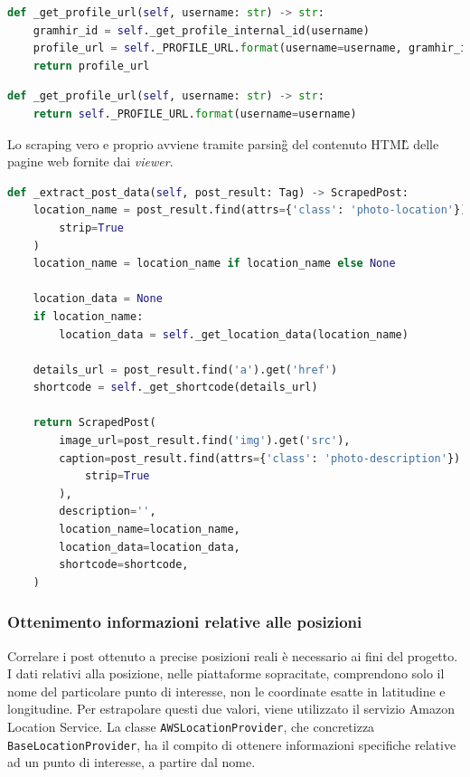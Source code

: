 \begin{lstlisting}[language=Python, caption=Ottenimento URL profilo in \textit{Gramhir}]
def _get_profile_url(self, username: str) -> str:
    gramhir_id = self._get_profile_internal_id(username)
    profile_url = self._PROFILE_URL.format(username=username, gramhir_id=gramhir_id)
    return profile_url
\end{lstlisting}

\begin{lstlisting}[language=Python, caption=Ottenimento URL profilo in \textit{Picuki}]
def _get_profile_url(self, username: str) -> str:
    return self._PROFILE_URL.format(username=username)
\end{lstlisting}

\aCapo{}
Lo scraping vero e proprio avviene tramite parsing\G{} del contenuto HTML\G{} delle pagine web
fornite dai \textit{viewer}.
\begin{lstlisting}[language=Python, caption=Estrazioni dati tramite parsing\G{}]
def _extract_post_data(self, post_result: Tag) -> ScrapedPost:
    location_name = post_result.find(attrs={'class': 'photo-location'}).get_text(
        strip=True
    )
    location_name = location_name if location_name else None

    location_data = None
    if location_name:
        location_data = self._get_location_data(location_name)

    details_url = post_result.find('a').get('href')
    shortcode = self._get_shortcode(details_url)

    return ScrapedPost(
        image_url=post_result.find('img').get('src'),
        caption=post_result.find(attrs={'class': 'photo-description'}).get_text(
            strip=True
        ),
        description='',
        location_name=location_name,
        location_data=location_data,
        shortcode=shortcode,
    )
\end{lstlisting}

\subsubsection{Ottenimento informazioni relative alle posizioni}
Correlare i post ottenuto a precise posizioni reali è necessario ai fini del progetto.
I dati relativi alla posizione, nelle piattaforme sopracitate, comprendono solo il nome del
particolare punto di interesse, non le coordinate esatte in latitudine e longitudine.
Per estrapolare questi due valori, viene utilizzato il servizio Amazon Location Service.\aCapo{}
La classe \verb|AWSLocationProvider|, che concretizza \verb|BaseLocationProvider|, ha il compito
di ottenere informazioni specifiche relative ad un punto di interesse, a partire dal nome.

